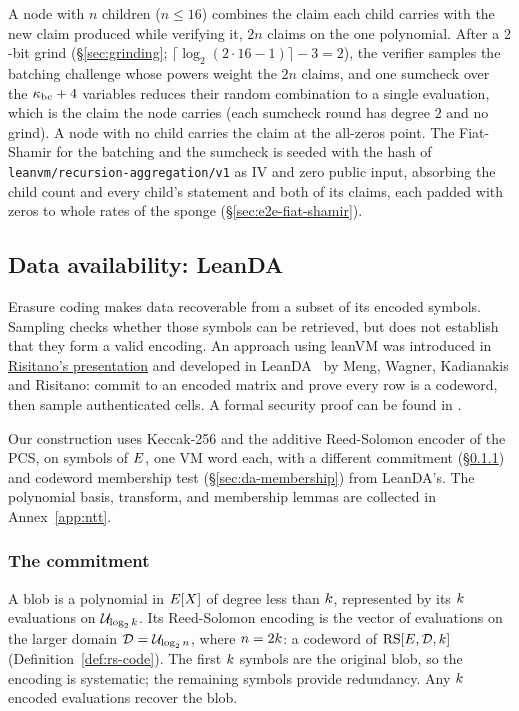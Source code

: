 A node with $n$ children ($n\le16$) combines the claim each child carries with the new claim produced while verifying it, $2n$ claims on the one polynomial. After a $2$-bit grind (\S\ref{sec:grinding}; $\lceil\log_2(2\cdot16-1)\rceil-3=2$), the verifier samples the batching challenge whose powers weight the $2n$ claims, and one sumcheck over the $\kappa_{\mathrm{bc}}+4$ variables reduces their random combination to a single evaluation, which is the claim the node carries (each sumcheck round has degree $2$ and no grind). A node with no child carries the claim at the all-zeros point. The Fiat-Shamir for the batching and the sumcheck is seeded with the hash of \texttt{leanvm/recursion-aggregation/v1} as IV and zero public input, absorbing the child count and every child's statement and both of its claims, each padded with zeros to whole rates of the sponge (\S\ref{sec:e2e-fiat-shamir}).

\subsection{Data availability: LeanDA}\label{sec:leanda}

Erasure coding makes data recoverable from a subset of its encoded symbols. Sampling checks whether those symbols can be retrieved, but does not establish that they form a valid encoding. An approach using leanVM was introduced in \href{https://frisitano.github.io/slides/presentations/leanvm-fold-in-circuit-das-2026-05-08/index.html}{Risitano's presentation} and developed in LeanDA~\cite{LeanDA} by Meng, Wagner, Kadianakis and Risitano: commit to an encoded matrix and prove every row is a codeword, then sample authenticated cells. A formal security proof can be found in \cite{LeanDASecurity}.

Our construction uses Keccak-256 and the additive Reed-Solomon encoder of the PCS, on symbols of $E$, one VM word each, with a different commitment (\S\ref{sec:da-commit}) and codeword membership test (\S\ref{sec:da-membership}) from LeanDA's. The polynomial basis, transform, and membership lemmas are collected in Annex~\ref{app:ntt}.


\subsubsection{The commitment}\label{sec:da-commit}

A blob is a polynomial in $E[X]$ of degree less than $k$, represented by its $k$ evaluations on $\mathcal{U}_{\log_2k}$. Its Reed-Solomon encoding is the vector of evaluations on the larger domain $\mathcal{D}=\mathcal{U}_{\log_2n}$, where $n=2k$: a codeword of $\mathrm{RS}[E,\mathcal{D},k]$ (Definition~\ref{def:rs-code}). The first $k$ symbols are the original blob, so the encoding is systematic; the remaining symbols provide redundancy. Any $k$ encoded evaluations recover the blob.

